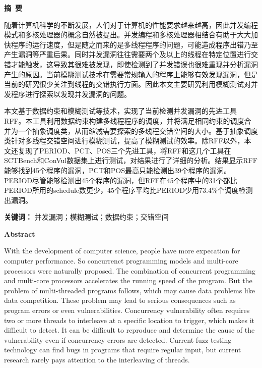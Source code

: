 \cleardoublepage{}
\begin{center}
    \bfseries {} 摘~要
\end{center}

随着计算机科学的不断发展，人们对于计算机的性能要求越来越高，因此并发编程模式和多核处理器的概念自然被提出。并发编程和多核处理器相结合有助于大大加快程序的运行速度，但是随之而来的是多线程程序的问题，可能造成程序出错乃至产生漏洞等严重后果。同时并发漏洞往往需要两个及以上的线程在特定位置进行交错才能触发，这导致其很难被发现，即使检测到了并发错误也很难重现并分析漏洞产生的原因。当前模糊测试技术在需要常规输入的程序上能够有效发现漏洞，但是当前的研究很少关注到线程的交错执行方面。因此本文主要研究利用模糊测试对并发程序进行探索以发现并发漏洞的问题。

本文基于数据约束和模糊测试等技术，实现了当前检测并发漏洞的先进工具RFF。本工具利用数据约束构建多线程程序的调度，并将满足相同约束的调度合并为一个抽象调度类，从而缩减需要探索的多线程交错空间的大小。基于抽象调度类针对多线程交错空间进行模糊测试，提高了模糊测试的效率。除RFF以外，本文还复现了PERIOD、PCT、POS三个先进工具，将RFF和这几个工具在SCTBench和ConVul数据集上进行测试，对结果进行了详细的分析。结果显示RFF能够找到45个程序的漏洞，PCT和POS最高只能检测出39个程序的漏洞。PERIOD尽管能够检测出45个程序的漏洞，但RFF在45个程序中的31个都比PERIOD所用的schedule数更少，45个程序平均比PERIOD少用73.4\%个调度检测出漏洞。

\textbf{关键词：} 并发漏洞；模糊测试；数据约束；交错空间

\cleardoublepage{}
\begin{center}
    \bfseries {} Abstract
\end{center}

With the development of computer science, people have more expecation for computer performance. So concurrenct programming models and multi-core processors were naturally proposed. The combination of concurrent programming and multi-core processors accelerates the running speed of the program. But the problem of multi-threaded programs follows, which may cause data problems like data competition. These problem may lead to serious consequences such as program errors or even vulnerabilities. Concurrency vulnerability often requires two or more threads to interleave at a specific location to trigger, which makes it difficult to detect. It can be difficult to reproduce and determine the cause of the vulnerability even if concurrency errors are detected. Current fuzz testing technology can find bugs in programs that require regular input, but current research rarely pays attention to the interleaving of threads.

